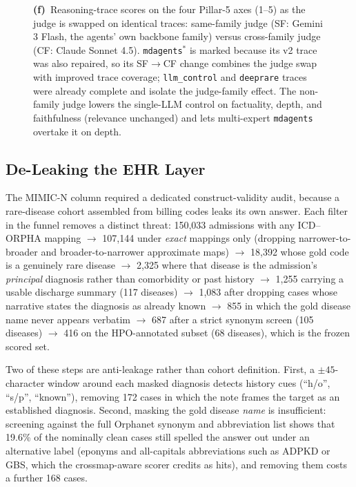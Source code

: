 \documentclass[letterpaper]{article} %
\begin{document}
\begin{figure}[t]
{\textbf{(f)}~Reasoning-trace scores on the four Pillar-5 axes (1--5) as the judge is swapped on identical traces: same-family judge (SF: Gemini 3 Flash, the agents' own backbone family) versus cross-family judge (CF: Claude Sonnet 4.5). \texttt{mdagents}$^{*}$ is marked because its v2 trace was also repaired, so its SF$\rightarrow$CF change combines the judge swap with improved trace coverage; \texttt{llm\_control} and \texttt{deeprare} traces were already complete and isolate the judge-family effect. The non-family judge lowers the single-LLM control on factuality, depth, and faithfulness (relevance unchanged) and lets multi-expert \texttt{mdagents} overtake it on depth.}
\label{fig:main6}
\end{figure}

\subsection{De-Leaking the EHR Layer}
\label{sec-6-deleak}

The MIMIC-N column required a dedicated construct-validity audit, because a
rare-disease cohort assembled from billing codes leaks its own answer. Each
filter in the funnel removes a distinct threat: 150,033 admissions with any
ICD--ORPHA mapping $\rightarrow$ 107,144 under \emph{exact} mappings only (dropping
narrower-to-broader and broader-to-narrower approximate maps) $\rightarrow$ 18,392
whose gold code is a genuinely rare disease $\rightarrow$ 2,325 where that disease is
the admission's \emph{principal} diagnosis rather than comorbidity or past history
$\rightarrow$ 1,255 carrying a usable discharge summary (117 diseases) $\rightarrow$
1,083 after dropping cases whose narrative states the diagnosis as already known
$\rightarrow$ 855 in which the gold disease name never appears verbatim
$\rightarrow$ 687 after a strict synonym screen (105 diseases) $\rightarrow$ 416 on the
HPO-annotated subset (68 diseases), which is the frozen scored set.

Two of these steps are anti-leakage rather than cohort definition. First, a
$\pm45$-character window around each masked diagnosis detects history cues
(``h/o'', ``s/p'', ``known''), removing 172 cases in which the note frames the
target as an established diagnosis. Second, masking the gold disease \emph{name}
is insufficient: screening against the full Orphanet synonym and abbreviation
list shows that 19.6\% of the nominally clean cases still spelled the answer out
under an alternative label (eponyms and all-capitals abbreviations such as ADPKD or
GBS, which the crossmap-aware scorer credits as hits), and removing them costs a
further 168 cases.
\end{document}
